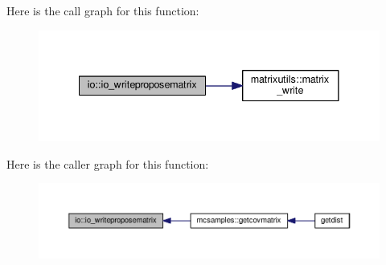 Here is the call graph for this function\+:
\nopagebreak
\begin{figure}[H]
\begin{center}
\leavevmode
\includegraphics[width=338pt]{namespaceio_a66f16ed76a4e04dc87230befac8fb1cf_cgraph}
\end{center}
\end{figure}
Here is the caller graph for this function\+:
\nopagebreak
\begin{figure}[H]
\begin{center}
\leavevmode
\includegraphics[width=350pt]{namespaceio_a66f16ed76a4e04dc87230befac8fb1cf_icgraph}
\end{center}
\end{figure}
